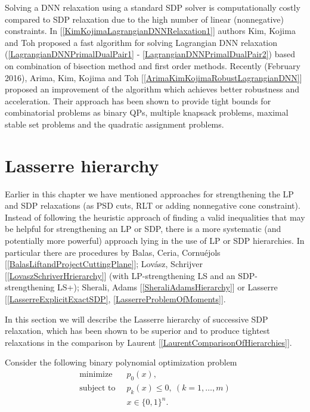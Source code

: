 \documentclass[12pt]{book}
\theoremstyle{definition}
\begin{document}
Solving a DNN relaxation using a standard SDP solver is computationally costly compared to SDP relaxation due to the high number of linear (nonnegative) constraints. In [\ref{KimKojimaLagrangianDNNRelaxation1}] authors Kim, Kojima and Toh proposed a fast algorithm for solving Lagrangian DNN relaxation (\ref{LagrangianDNNPrimalDualPair1} - \ref{LagrangianDNNPrimalDualPair2}) based on combination of bisection method and first order methods. Recently (February 2016), Arima, Kim, Kojima and Toh [\ref{ArimaKimKojimaRobustLagrangianDNN}] proposed an improvement of the algorithm which achieves better robustness and acceleration. Their approach has been shown to provide tight bounds for combinatorial problems as binary QPs, multiple knapsack problems, maximal stable set problems and the quadratic assignment problems.
 


\section{Lasserre hierarchy}


Earlier in this chapter we have mentioned approaches for strengthening the LP and SDP relaxations (as PSD cuts, RLT or adding nonnegative cone constraint). 
Instead of following the heuristic approach of finding a valid inequalities that may be helpful
for strengthening an LP or SDP, there is a more systematic (and potentially more powerful) approach
lying in the use of LP or SDP hierarchies. In particular there are procedures
by Balas, Ceria, Cornuéjols [\ref{BalasLiftandProjectCuttingPlane}]; Lovász, Schrijver [\ref{LovaszSchriverHrierarchy}] (with LP-strengthening LS
and an SDP-strengthening LS+); Sherali, Adams [\ref{SheraliAdamsHierarchy}] or Lasserre [\ref{LasserreExplicitExactSDP}, \ref{LasserreProblemOfMoments}].  

In this section we will describe the Lasserre hierarchy of successive SDP relaxation, which has been shown to be superior and to produce tightest relaxations in the comparison by Laurent [\ref{LaurentComparisonOfHierarchies}].


Consider the following binary polynomial optimization problem
\begin{equation}
\label{POP1}
\begin{array}{ll}
\mbox{minimize }   & \ p_0(x), 	\\
\mbox{subject to } & \ p_k(x)\leq 0, \ (k=1,\dots ,m) 	\\
		   & \ x\in\{ 0, 1 \}^n.
\end{array}
\end{equation}
\end{document}
